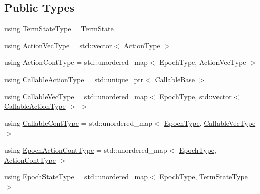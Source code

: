 \subsection*{Public Types}
\begin{DoxyCompactItemize}
\item 
using \hyperlink{structvt_1_1term_1_1_term_action_ae4c635b69751d887666814700ed64d65}{Term\+State\+Type} = \hyperlink{structvt_1_1term_1_1_term_state}{Term\+State}
\item 
using \hyperlink{structvt_1_1term_1_1_term_action_a76d94f79a48ba8367b68f9188784da88}{Action\+Vec\+Type} = std\+::vector$<$ \hyperlink{namespacevt_ae0a5a7b18cc99d7b732cb4d44f46b0f3}{Action\+Type} $>$
\item 
using \hyperlink{structvt_1_1term_1_1_term_action_aec4a5ca3c0b2d9ae23defb65d27d2984}{Action\+Cont\+Type} = std\+::unordered\+\_\+map$<$ \hyperlink{namespacevt_a81d11b28122d43bf9834577e4a06440f}{Epoch\+Type}, \hyperlink{structvt_1_1term_1_1_term_action_a76d94f79a48ba8367b68f9188784da88}{Action\+Vec\+Type} $>$
\item 
using \hyperlink{structvt_1_1term_1_1_term_action_aa4a32326730b20530526e1db6512c017}{Callable\+Action\+Type} = std\+::unique\+\_\+ptr$<$ \hyperlink{structvt_1_1term_1_1_callable_base}{Callable\+Base} $>$
\item 
using \hyperlink{structvt_1_1term_1_1_term_action_a22cab5da9e6f6736aef4e20ad1d5356b}{Callable\+Vec\+Type} = std\+::unordered\+\_\+map$<$ \hyperlink{namespacevt_a81d11b28122d43bf9834577e4a06440f}{Epoch\+Type}, std\+::vector$<$ \hyperlink{structvt_1_1term_1_1_term_action_aa4a32326730b20530526e1db6512c017}{Callable\+Action\+Type} $>$ $>$
\item 
using \hyperlink{structvt_1_1term_1_1_term_action_a802aaa899ce87dc9f8a53d43b202044c}{Callable\+Cont\+Type} = std\+::unordered\+\_\+map$<$ \hyperlink{namespacevt_a81d11b28122d43bf9834577e4a06440f}{Epoch\+Type}, \hyperlink{structvt_1_1term_1_1_term_action_a22cab5da9e6f6736aef4e20ad1d5356b}{Callable\+Vec\+Type} $>$
\item 
using \hyperlink{structvt_1_1term_1_1_term_action_acefe3cb1e2a2bcf0d530082f53a2bada}{Epoch\+Action\+Cont\+Type} = std\+::unordered\+\_\+map$<$ \hyperlink{namespacevt_a81d11b28122d43bf9834577e4a06440f}{Epoch\+Type}, \hyperlink{structvt_1_1term_1_1_term_action_aec4a5ca3c0b2d9ae23defb65d27d2984}{Action\+Cont\+Type} $>$
\item 
using \hyperlink{structvt_1_1term_1_1_term_action_afcbc07a9b40ff2b6d53e9522877a745d}{Epoch\+State\+Type} = std\+::unordered\+\_\+map$<$ \hyperlink{namespacevt_a81d11b28122d43bf9834577e4a06440f}{Epoch\+Type}, \hyperlink{structvt_1_1term_1_1_term_action_ae4c635b69751d887666814700ed64d65}{Term\+State\+Type} $>$
\end{DoxyCompactItemize}

